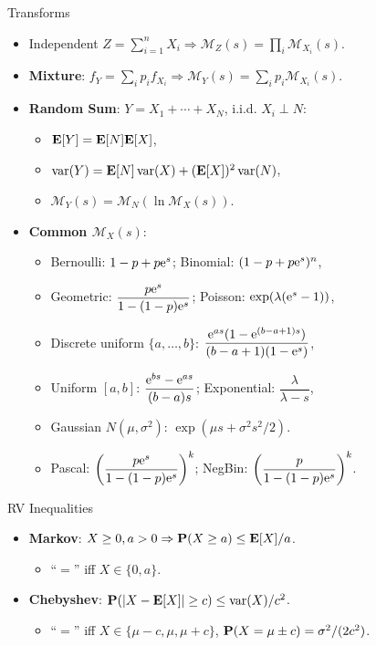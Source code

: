 \documentclass[landscape,a4paper]{article}
\begin{document}
\begin{cheatsheetcolumns}
\begin{card}{Transforms}
\begin{itemize}
				\item Independent $Z=\sum_{i=1}^nX_i\Rightarrow\mathscr{M}_Z(s)=\prod_i\mathscr{M}_{X_i}(s)$.
				\item \textbf{Mixture}: $f_Y=\sum_ip_if_{X_i}\Rightarrow\mathscr{M}_Y(s)=\sum_ip_i\mathscr{M}_{X_i}(s)$.
				\item \textbf{Random Sum}: $Y=X_1+\cdots+X_N$, i.i.d. $X_i\perp N$:
				\begin{itemize}
					\item $\mathbf{E}[Y]=\mathbf{E}[N]\mathbf{E}[X]$,
					\item $\operatorname{var}(Y)=\mathbf{E}[N]\operatorname{var}(X)+(\mathbf{E}[X])^2\operatorname{var}(N)$,
					\item $\mathscr{M}_Y(s)=\mathscr{M}_N(\ln\mathscr{M}_X(s))$.
				\end{itemize}
				\item \textbf{Common $\mathscr{M}_X(s)$}:
				\begin{itemize}
					\item Bernoulli: $1-p+p\mathrm{e}^s$; Binomial: $(1-p+p\mathrm{e}^s)^n$,
					\item Geometric: $\dfrac{p\mathrm{e}^s}{1-(1-p)\mathrm{e}^s}$; Poisson: $\exp(\lambda(\mathrm{e}^s-1))$,
					\item Discrete uniform $\{a,\dots,b\}$: $\dfrac{\mathrm{e}^{as}(1-\mathrm{e}^{(b-a+1)s})}{(b-a+1)(1-\mathrm{e}^s)}$,
					\item Uniform $[a,b]$: $\dfrac{\mathrm{e}^{bs}-\mathrm{e}^{as}}{(b-a)s}$; Exponential: $\dfrac{\lambda}{\lambda-s}$,
					\item Gaussian $N(\mu,\sigma^2)$: $\exp(\mu s+\sigma^2s^2/2)$.
					\item Pascal: $\left(\dfrac{p\mathrm{e}^{s}}{1-(1-p)\mathrm{e}^{s}}\right)^k$; NegBin: $\left(\dfrac{p}{1-(1-p)\mathrm{e}^{s}}\right)^k$.
				\end{itemize}
			\end{itemize}
		\end{card}
		\begin{card}{RV Inequalities}
			\begin{itemize}
				\item \textbf{Markov}: $X\ge0,a>0\Rightarrow \mathbf{P}(X\ge a)\le \mathbf{E}[X]/a$.
				\begin{itemize}
					\item ``$=$'' iff $X\in\{0,a\}$.
				\end{itemize}
				\item \textbf{Chebyshev}: $\mathbf{P}(|X-\mathbf{E}[X]|\ge c)\le \operatorname{var}(X)/c^2$.
				\begin{itemize}
					\item ``$=$'' iff $X\in\{\mu-c,\mu,\mu+c\}$, $\mathbf{P}(X=\mu\pm c)=\sigma^2/(2c^2)$.

\end{itemize}
\end{itemize}
\end{card}
\end{cheatsheetcolumns}
\end{document}
